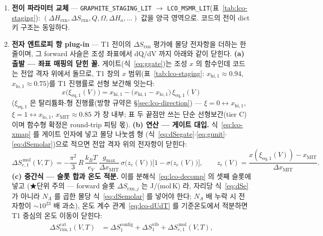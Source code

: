 \documentclass[11pt,a4paper]{article}
\newcommand{\eq}{\mathrm{eq}}
\newcommand{\rxn}{\mathrm{rxn}}
\newcommand{\code}[1]{\texttt{#1}}
\begin{document}
\begin{enumerate}[label=(\roman*),leftmargin=2.2em,itemsep=1pt]
\item \textbf{전이 파라미터 교체} — \code{GRAPHITE\_STAGING\_LIT} $\to$ \code{LCO\_MSMR\_LIT}(표~\ref{tab:lco-staging}):
$(\Delta H_\rxn,\Delta S_\rxn,Q,\Omega,\Delta H_a,\dots)$ 값을 양극 영역으로. 코드의 전이 dict 키 구조는 동일하다.
\item \textbf{전자 엔트로피 항 plug-in} — T1 전이의 $\Delta S_{\rxn}$ 평가에 몰당 전자항을 더하는 한 줄이며,
그 forward 사슬은 조성 좌표에서 dQ/dV 까지 아래와 같이 닫힌다.
\textbf{(a) 출발 — 좌표 매핑의 닫힌 꼴.} 게이트(식~\eqref{eq:ggate})는 조성 $x$ 의 함수인데 코드는 전압
격자 위에서 돌므로, T1 창의 $x$ 범위(표~\ref{tab:lco-staging}: $x_{\mathrm{hi},1}{\approx}0.94$,
$x_{\mathrm{lo},1}{\approx}0.75$)를 T1 진행률로 선형 보간해 잇는다:
\begin{equation}
x\big(\xi_{\eq,1}(V)\big)=x_{\mathrm{hi},1}-\big(x_{\mathrm{hi},1}-x_{\mathrm{lo},1}\big)\,\xi_{\eq,1}(V)
\label{eq:lco-xmap}
\end{equation}
($\xi_{\eq,1}$ 은 탈리튬화-형 진행률(방향 규약은 \S\ref{sec:lco-direction}) — $\xi{=}0\leftrightarrow x_{\mathrm{hi},1}$, $\xi{=}1\leftrightarrow x_{\mathrm{lo},1}$, $x_\mathrm{MIT}{\approx}0.85$ 가 창 내부; 표 두 끝점만 쓰는 단순 선형보간(tier C)이며 함수형 확정은 round-trip 피팅 몫).
\textbf{(b) 연산 — 게이트 대입.} 식~\eqref{eq:lco-xmap} 를 게이트 인자에 넣고 몰당 나눗셈 형
(식~\eqref{eq:dSegate}$\cdot$\eqref{eq:gunit}$\cdot$\eqref{eq:dSemolar})으로 적으면 전압 격자 위의
전자항이 닫힌다:
\begin{equation}
\Delta S_{e,1}^{\,\mathrm{mol}}(V,T)
=-\frac{\pi^2}{3}\,R\,\frac{k_BT}{e_V}\,\frac{g_{\max}}{\Delta x_\mathrm{MIT}}\,
\sigma\!\big(z_e(V)\big)\big[1-\sigma\!\big(z_e(V)\big)\big],
\qquad z_e(V)=\frac{x(\xi_{\eq,1}(V))-x_\mathrm{MIT}}{\Delta x_\mathrm{MIT}}.
\label{eq:lco-SeV}
\end{equation}
\textbf{(c) 중간식 — 슬롯 합과 온도 적분.} 이를 분해식~\eqref{eq:lco-decomp} 의 셋째 슬롯에 넣고
(★단위 주의 — forward 슬롯 $\Delta S_{\rxn,j}$ 는 J/(mol\,K) 라, 자리당 식~\eqref{eq:dSe} 가 아니라
$N_A$ 를 곱한 몰당 식~\eqref{eq:dSemolar} 를 넣어야 한다; $N_A$ 배 누락 시 전자항이 $\sim10^{23}$ 배
과소), 온도 계수 관계~\eqref{eq:lco-dUdT} 를 기준온도에서 적분하면 T1 중심의 온도 이동이 닫힌다:
\begin{equation}
\begin{aligned}
\Delta S_{\rxn,1}^\mathrm{cat}(V,T)&=\Delta S_1^\mathrm{config}+\Delta S_1^\mathrm{vib}
+\Delta S_{e,1}^{\,\mathrm{mol}}(V,T),\\

\end{aligned}
\end{equation}
\end{enumerate}
\end{document}
